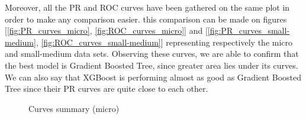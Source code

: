 \documentclass[LaM,binding=0.6cm, english]{sapthesis}
\begin{document}
\begin{table}[!ht]
\centering
{}
\vspace{2mm}
\caption{Results summary (Small-medium)}
\label{results_summary_small-medium}
\end{table}

Moreover, all the PR and ROC curves have been gathered on the same plot in order to make any comparison easier. this comparison can be made on figures [\ref{fig:PR_curves_micro}, \ref{fig:ROC_curves_micro}] and [\ref{fig:PR_curves_small-medium}, \ref{fig:ROC_curves_small-medium}] representing respectively the micro and small-medium data sets. Observing these curves, we are able to confirm that the best model is Gradient Boosted Tree, since greater area lies under its curves. We can also say that XGBoost is performing almost as good as Gradient Boosted Tree since their PR curves are quite close to each other.

\begin{figure}[!ht]
  \centering
  \hfill
  \caption{Curves summary (micro)}
\end{figure}
\end{document}
